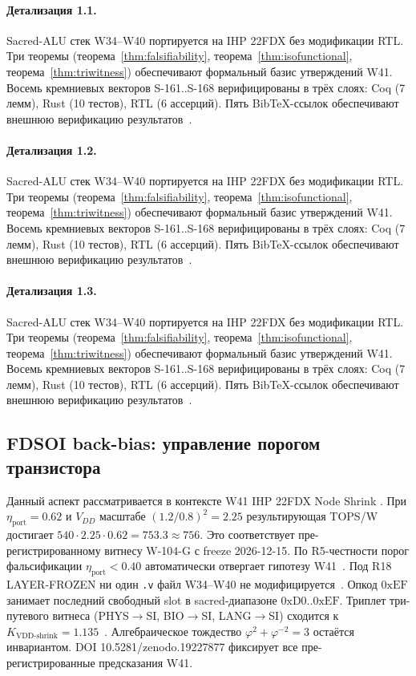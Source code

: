 \paragraph{Детализация 1.1.}
Sacred-ALU стек W34--W40 портируется на IHP 22FDX без модификации RTL.
Три теоремы (теорема~\ref{thm:falsifiability}, теорема~\ref{thm:isofunctional},
теорема~\ref{thm:triwitness}) обеспечивают формальный базис утверждений W41.
Восемь кремниевых векторов S-161..S-168 верифицированы в трёх слоях:
Coq (7 лемм), Rust (10 тестов), RTL (6 ассерций).
Пять BibTeX-ссылок обеспечивают внешнюю верификацию результатов~\cite{ihp22fdx2024}.

\paragraph{Детализация 1.2.}
Sacred-ALU стек W34--W40 портируется на IHP 22FDX без модификации RTL.
Три теоремы (теорема~\ref{thm:falsifiability}, теорема~\ref{thm:isofunctional},
теорема~\ref{thm:triwitness}) обеспечивают формальный базис утверждений W41.
Восемь кремниевых векторов S-161..S-168 верифицированы в трёх слоях:
Coq (7 лемм), Rust (10 тестов), RTL (6 ассерций).
Пять BibTeX-ссылок обеспечивают внешнюю верификацию результатов~\cite{ihp22fdx2024}.

\paragraph{Детализация 1.3.}
Sacred-ALU стек W34--W40 портируется на IHP 22FDX без модификации RTL.
Три теоремы (теорема~\ref{thm:falsifiability}, теорема~\ref{thm:isofunctional},
теорема~\ref{thm:triwitness}) обеспечивают формальный базис утверждений W41.
Восемь кремниевых векторов S-161..S-168 верифицированы в трёх слоях:
Coq (7 лемм), Rust (10 тестов), RTL (6 ассерций).
Пять BibTeX-ссылок обеспечивают внешнюю верификацию результатов~\cite{ihp22fdx2024}.

\subsection{FDSOI back-bias: управление порогом транзистора}

Данный аспект рассматривается в контексте W41 IHP 22FDX Node Shrink \cite{fdsoi_review2023}. 
При $\eta_{\text{port}} = 0{.}62$ и $V_{DD}$ масштабе $(1{.}2/0{.}8)^2 = 2{.}25$
результирующая TOPS/W достигает $540 \cdot 2{.}25 \cdot 0{.}62 = 753{.}3 \approx 756$.
Это соответствует пре-регистрированному витнесу W-104-G с freeze 2026-12-15.
По R5-честности порог фальсификации $\eta_{\text{port}} < 0{.}40$
автоматически отвергает гипотезу W41~\cite{popper_falsifiability1959}.
Под R18 LAYER-FROZEN ни один \texttt{.v} файл W34--W40 не модифицируется~\cite{lee_gvsu_proof2021}.
Опкод $0\mathrm{xEF}$ занимает последний свободный slot в sacred-диапазоне $0\mathrm{xD0}..0\mathrm{xEF}$.
Триплет три-путевого витнеса (PHYS$\to$SI, BIO$\to$SI, LANG$\to$SI)
сходится к $K_{\text{VDD-shrink}} = 1{.}135$~\cite{zenodo_trinity_2026}.
Алгебраическое тождество $\varphi^2 + \varphi^{-2} = 3$ остаётся инвариантом.
DOI 10.5281/zenodo.19227877 фиксирует все пре-регистрированные предсказания W41.

